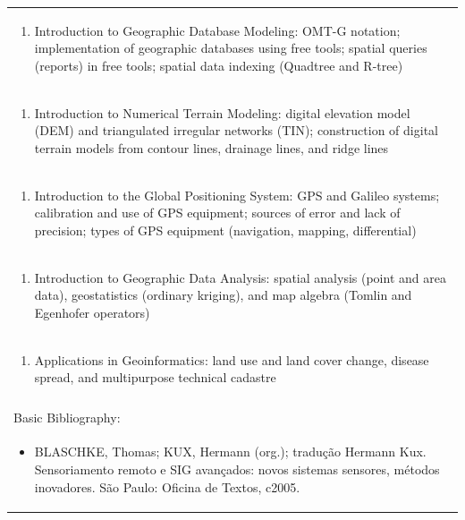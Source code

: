 \documentclass[11pt]{article}
\begin{document}
\begin{center}
\begin{longtable}{|p{4cm}|p{4cm}|p{4cm}|p{4cm}|}
\multicolumn{4}{|p{\dimexpr 16cm + 6\tabcolsep\relax}|}{\begin{enumerate}[start=5]\item Introduction to Geographic Database Modeling: OMT-G notation; implementation of geographic databases using free tools; spatial queries (reports) in free tools; spatial data indexing (Quadtree and R-tree)\end{enumerate}}\\
\multicolumn{4}{|p{\dimexpr 16cm + 6\tabcolsep\relax}|}{\begin{enumerate}[start=6]\item Introduction to Numerical Terrain Modeling: digital elevation model (DEM) and triangulated irregular networks (TIN); construction of digital terrain models from contour lines, drainage lines, and ridge lines\end{enumerate}}\\
\multicolumn{4}{|p{\dimexpr 16cm + 6\tabcolsep\relax}|}{\begin{enumerate}[start=7]\item Introduction to the Global Positioning System: GPS and Galileo systems; calibration and use of GPS equipment; sources of error and lack of precision; types of GPS equipment (navigation, mapping, differential)\end{enumerate}}\\
\multicolumn{4}{|p{\dimexpr 16cm + 6\tabcolsep\relax}|}{\begin{enumerate}[start=8]\item Introduction to Geographic Data Analysis: spatial analysis (point and area data), geostatistics (ordinary kriging), and map algebra (Tomlin and Egenhofer operators)\end{enumerate}}\\
\multicolumn{4}{|p{\dimexpr 16cm + 6\tabcolsep\relax}|}{\begin{enumerate}[start=9]\item Applications in Geoinformatics: land use and land cover change, disease spread, and multipurpose technical cadastre\end{enumerate}}\\
\multicolumn{4}{|p{\dimexpr 16cm + 6\tabcolsep\relax}|}{}\\
\hline
\multicolumn{4}{|p{16cm}|}{Basic Bibliography:}\\*
\multicolumn{4}{|p{\dimexpr 16cm + 6\tabcolsep\relax}|}{\begin{itemize}\item BLASCHKE, Thomas; KUX, Hermann (org.); tradução Hermann Kux. Sensoriamento remoto e SIG avançados: novos sistemas sensores, métodos inovadores. São Paulo: Oficina de Textos, c2005.\end{itemize}}\\

\end{longtable}
\end{center}
\end{document}
